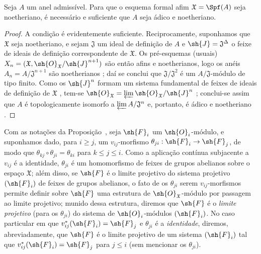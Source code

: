 \documentclass[oneside]{amsart}
\makeatletter
\renewcommand{\leq}{\leqslant}
\renewcommand{\geq}{\geqslant}
\newcommand{\ega@arrow}[2]{\mathchoice{#1}{#2}{#2}{#2}}
\renewcommand{\to}{\ega@arrow{\longrightarrow}{\rightarrow}}
\let\EGAOriginalLabel\label
\renewcommand{\label}[1]{\phantomsection\EGAOriginalLabel{#1}}
\makeatother
\begin{document}
\begin{corollary}[10.6.5]
\label{I.10.6.5}
Seja $A$ um anel admissível.
Para que o esquema formal afim $\mathfrak{X}=\Spf(A)$ seja noetheriano, é necessário e suficiente que $A$ seja ádico e noetheriano.
\end{corollary}

\begin{proof}
A condição é evidentemente suficiente.
Reciprocamente, suponhamos que $\mathfrak{X}$ seja noetheriano, e sejam $\mathfrak{J}$ um ideal de definição de $A$ e $\sh{J}=\mathfrak{J}^\Delta$ o feixe de ideais de definição correspondente de $\mathfrak{X}$.
Os pré-esquemas (usuais) $X_n=(\mathfrak{X},\sh{O}_\mathfrak{X}/\sh{J}^{n+1})$ são então afins e noetherianos, logo os anéis $A_n=A/\mathfrak{J}^{n+1}$ são noetherianos ; daí se conclui que $\mathfrak{J}/\mathfrak{J}^2$ é um $A/\mathfrak{J}$-módulo de tipo finito.
Como os $\sh{J}^n$ formam um sistema fundamental de feixes de ideais de definição de $\mathfrak{X}$ , tem-se $\sh{O}_\mathfrak{X}=\varprojlim\sh{O}_\mathfrak{X}/\sh{J}^n$ ; conclui-se assim  que $A$ é topologicamente isomorfo a $\varprojlim A/\mathfrak{J}^n$ e, portanto, é ádico e noetheriano .
\end{proof}

\begin{remark}[10.6.6]
\label{I.10.6.6}
Com as notações da Proposição~, seja $\sh{F}_i$ um $\sh{O}_i$-módulo, e suponhamos dado, para $i\geq j$, um $v_{ij}$-morfismo $\theta_{ji}:\sh{F}_i\to\sh{F}_j$, de modo que $\theta_{kj}\circ\theta_{ji}=\theta_{ki}$ para $k\leq j\leq i$.
Como a aplicação contínua subjacente a $v_{ij}$ é a identidade, $\theta_{ji}$ é um homomorfismo de feixes de grupos abelianos sobre o espaço $\mathfrak{X}$; além disso, se $\sh{F}$ é o limite projetivo do sistema projetivo $(\sh{F}_i)$ de feixes de grupos abelianos, o fato de os $\theta_{ji}$ serem $v_{ij}$-morfismos permite definir sobre $\sh{F}$ uma estrutura de $\sh{O}_\mathfrak{X}$-módulo por passagem ao limite projetivo; munido dessa estrutura, diremos que $\sh{F}$ é o \emph{limite projetivo} (para os $\theta_{ji}$) do sistema de $\sh{O}_i$-módulos $(\sh{F}_i)$.
No caso particular em que $v_{ij}^*(\sh{F}_i)=\sh{F}_j$ e $\theta_{ji}$ é a \emph{identidade}, diremos, abreviadamente, que $\sh{F}$ é o limite projetivo de um sistema $(\sh{F}_i)$ tal que $v_{ij}^*(\sh{F}_i)=\sh{F}_j$ para $j\leq i$ (sem mencionar os $\theta_{ji}$).
\end{remark}
\end{document}
